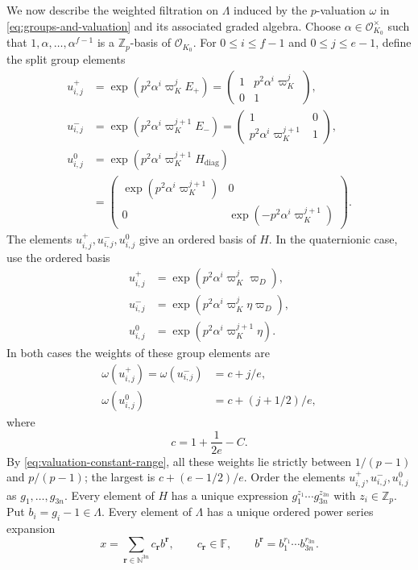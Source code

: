 \documentclass[11pt]{article}
\numberwithin{equation}{section}
\theoremstyle{definition}
\theoremstyle{remark}
\newcommand{\F}{\mathbb F}
\newcommand{\Z}{\mathbb Z}
\newcommand{\N}{\mathbb N}
\newcommand{\cO}{\mathcal O}
\begin{document}
We now describe the weighted filtration on $\Lambda$ induced by the
$p$-valuation $\omega$ in \eqref{eq:groups-and-valuation} and its
associated graded algebra.
Choose $\alpha\in\cO_{K_0}^{\times}$ such that
$1,\alpha,\ldots,\alpha^{f-1}$ is a $\Z_p$-basis of $\cO_{K_0}$.
For $0\leq i\leq f-1$ and $0\leq j\leq e-1$, define the split group elements
\begin{align*}
 u^+_{i,j}&=\exp(p^2\alpha^i\varpi_K^jE_+)
    =\begin{pmatrix}1&p^2\alpha^i\varpi_K^j\\0&1\end{pmatrix},\\[4pt]
 u^-_{i,j}&=\exp(p^2\alpha^i\varpi_K^{j+1}E_-)
    =\begin{pmatrix}1&0\\p^2\alpha^i\varpi_K^{j+1}&1\end{pmatrix},\\[4pt]
 u^0_{i,j}&=\exp(p^2\alpha^i\varpi_K^{j+1}H_{\mathrm{diag}})\\
    &=\begin{pmatrix}
       \exp(p^2\alpha^i\varpi_K^{j+1})&0\\
       0&\exp(-p^2\alpha^i\varpi_K^{j+1})
      \end{pmatrix}.
\end{align*}
The elements $u^+_{i,j},u^-_{i,j},u^0_{i,j}$ give an ordered
basis of $H$. In the quaternionic case, use
the ordered basis
\begin{align*}
 u^+_{i,j}&=\exp(p^2\alpha^i\varpi_K^j\varpi_D),\\
 u^-_{i,j}&=\exp(p^2\alpha^i\varpi_K^j\eta\varpi_D),\\
 u^0_{i,j}&=\exp(p^2\alpha^i\varpi_K^{j+1}\eta).
\end{align*}
In both cases the weights of these group elements are
\[
 \begin{aligned}
 \omega(u^+_{i,j})=\omega(u^-_{i,j})&=c+j/e,\\
 \omega(u^0_{i,j})&=c+(j+1/2)/e,
 \end{aligned}
\]
where
\[
 c=1+\frac1{2e}-C.
\]
By \eqref{eq:valuation-constant-range}, all these weights lie strictly
between $1/(p-1)$ and $p/(p-1)$;
the largest is $c+(e-1/2)/e$. Order the elements
$u^+_{i,j},u^-_{i,j},u^0_{i,j}$ as
$g_1,\ldots,g_{3n}$. Every element of $H$ has a unique expression
$g_1^{z_1}\cdots g_{3n}^{z_{3n}}$ with $z_i\in\Z_p$.
Put $b_i=g_i-1\in\Lambda$. Every element of $\Lambda$ has a
unique ordered power series expansion
\[
 x=\sum_{\mathbf r\in\N^{3n}}c_{\mathbf r}b^{\mathbf r},
 \qquad c_{\mathbf r}\in\F,\qquad
 b^{\mathbf r}=b_1^{r_1}\cdots b_{3n}^{r_{3n}}.
\]
\end{document}
